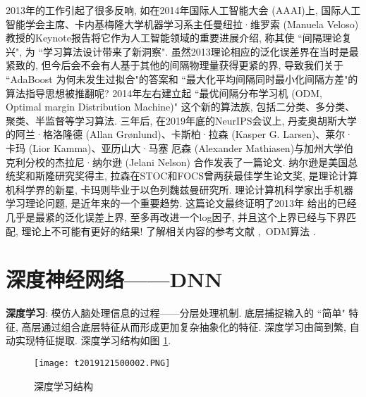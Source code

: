 2013年的工作引起了很多反响, 如在2014年国际人工智能大会 (AAAI)上, 国际人工智能学会主席、卡内基梅隆大学机器学习系主任曼纽拉·维罗索 (Manuela Veloso) 教授的Keynote报告将它作为人工智能领域的重要进展介绍, 称其使 ``间隔理论复兴", 为 ``学习算法设计带来了新洞察".
虽然2013理论相应的泛化误差界在当时是最紧致的, 但今后会不会有人基于其他的间隔物理量获得更紧的界, 导致我们关于  ``AdaBoost 为何未发生过拟合"的答案和 ``最大化平均间隔同时最小化间隔方差"的算法指导思想被推翻呢?
2014年左右建立起 ``最优间隔分布学习机 (ODM, Optimal margin Distribution Machine)" 这个新的算法族, 包括二分类、多分类、聚类、半监督等学习算法. 
三年后, 在2019年底的NeurIPS会议上, 丹麦奥胡斯大学的阿兰·格洛隆德 (Allan Grønlund)、卡斯柏·拉森 (Kasper G. Larsen)、莱尔·卡玛 (Lior Kamma)、亚历山大·马塞 厄森 (Alexander Mathiasen)与加州大学伯克利分校的杰拉尼·纳尔逊 (Jelani Nelson) 合作发表了一篇论文.
纳尔逊是美国总统奖和斯隆研究奖得主, 拉森在STOC和FOCS曾两获最佳学生论文奖, 是理论计算机科学界的新星, 卡玛则毕业于以色列魏兹曼研究所.
理论计算机科学家出手机器学习理论问题, 是近年来的一个重要趋势.
这篇论文最终证明了2013年 \cite{ZhouDBLP} 给出的已经几乎是最紧的泛化误差上界, 至多再改进一个log因子, 并且这个上界已经与下界匹配, 理论上不可能有更好的结果!
了解相关内容的参考文献 \cite{Zhou978-3-319-11656-3-1},\, ODM算法 \cite{Zhang2020-8638559,NIPS2019-9365}.
\section{深度神经网络——DNN}
\textbf{深度学习}: 模仿人脑处理信息的过程——分层处理机制.
底层捕捉输入的 “简单" 特征, 高层通过组合底层特征从而形成更加复杂抽象化的特征.
深度学习由简到繁, 自动实现特征提取.
深度学习结构如图 \ref{AI32fig2019121502}.
\begin{figure}[H]
    \centering
    \texttt{[image: t2019121500002.PNG]}
    \caption{深度学习结构}
    \label{AI32fig2019121502}
\end{figure}

